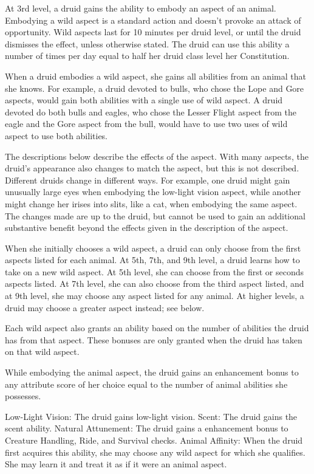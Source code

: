   At 3rd level, a druid gains the ability to embody an aspect of an animal. Embodying a wild aspect is a standard action and doesn't provoke an attack of opportunity. Wild aspects last for 10 minutes per druid level, or until the druid dismisses the effect, unless otherwise stated. The druid can use this ability a number of times per day equal to half her druid class level \add her Constitution.
\par When a druid embodies a wild aspect, she gains all abilities from an animal that she knows. For example, a druid devoted to bulls, who chose the Lope and Gore aspects, would gain both abilities with a single use of wild aspect. A druid devoted do both bulls and eagles, who chose the Lesser Flight aspect from the eagle and the Gore aspect from the bull, would have to use two uses of wild aspect to use both abilities.
\par The descriptions below describe the effects of the aspect. With many aspects, the druid's appearance also changes to match the aspect, but this is not described. Different druids change in different ways. For example, one druid might gain unusually large eyes when embodying the low-light vision aspect, while another might change her irises into slits, like a cat, when embodying the same aspect. The changes made are up to the druid, but cannot be used to gain an additional substantive benefit beyond the effects given in the description of the aspect.
\par When she initially chooses a wild aspect, a druid can only choose from the first aspects listed for each animal. At 5th, 7th, and 9th level, a druid learns how to take on a new wild aspect. At 5th level, she can choose from the first or seconds aspects listed. At 7th level, she can also choose from the third aspect listed, and at 9th level, she may choose any aspect listed for any animal. At higher levels, a druid may choose a greater aspect instead; see below.
\par Each wild aspect also grants an ability based on the number of abilities the druid has from that aspect. These bonuses are only granted when the druid has taken on that wild aspect.

While embodying the animal aspect, the druid gains an enhancement bonus to any attribute score of her choice equal to the number of animal abilities she possesses.
\begin{wildaspect}
\wilditem Low-Light Vision: The druid gains low-light vision.
\wilditem Scent: The druid gains the scent ability.
\wilditem Natural Attunement: The druid gains a  enhancement bonus to Creature Handling, Ride, and Survival checks.
\wilditem Animal Affinity: When the druid first acquires this ability, she may choose any wild aspect for which she qualifies. She may learn it and treat it as if it were an animal aspect.
\end{wildaspect}

